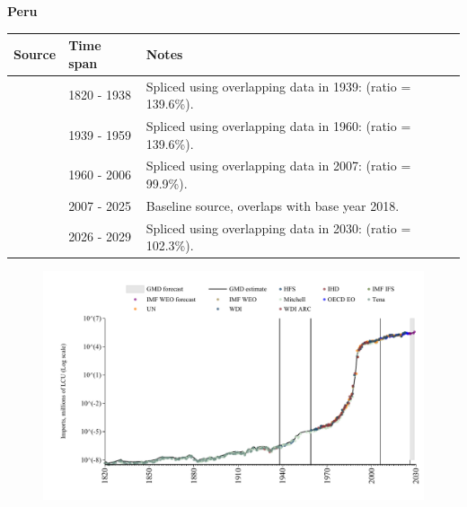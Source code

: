 \documentclass[12pt,a4paper,landscape]{article}
\begin{document}
\begin{adjustbox}{max totalsize={\paperwidth}{\paperheight},center}
\begin{minipage}[t][\textheight][t]{\textwidth}
\vspace*{0.5cm}
{}
\begin{center}
{\Large\bfseries Peru}
\end{center}
\vspace{0.5cm}
\begin{table}[H]
\centering
\small
\begin{tabular}{|l|l|l|}
\hline
\textbf{Source} & \textbf{Time span} & \textbf{Notes} \\
\hline
\rowcolor{white}\cite{Tena}& 1820 - 1938 &Spliced using overlapping data in 1939: (ratio = 139.6\%).\\
\rowcolor{lightgray}\cite{Mitchell}& 1939 - 1959 &Spliced using overlapping data in 1960: (ratio = 139.6\%).\\
\rowcolor{white}\cite{WDI}& 1960 - 2006 &Spliced using overlapping data in 2007: (ratio = 99.9\%).\\
\rowcolor{lightgray}\cite{OECD_EO}& 2007 - 2025 &Baseline source, overlaps with base year 2018.\\
\rowcolor{white}\cite{IMF_WEO_forecast}& 2026 - 2029 &Spliced using overlapping data in 2030: (ratio = 102.3\%).\\
\hline
\end{tabular}
\end{table}
\begin{figure}[H]
\centering
\includegraphics[width=\textwidth,height=0.6\textheight,keepaspectratio]{graphs/PER_imports.pdf}
\end{figure}
\end{minipage}
\end{adjustbox}
\end{document}
